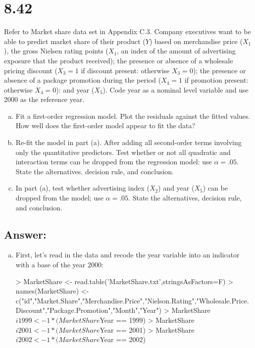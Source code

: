 \documentclass{article}
\begin{document}
\section{8.42}

Refer to Market share data set in Appendix C.3. Company executives want to be able to predict market share of their product ($Y$) based on merchandise price ($X_1$), the gross Nielsen rating points ($X_1$, an index of the amount of advertising exposure that the product received); the presence or absence of a wholesale pricing discount ($X_3 = 1$ if discount present: otherwise $X_3 = 0$); the presence or absence of a package promotion during the period ($X_4 = 1$ if promotion present: otherwise $X_4 = 0$): and year ($X_5$). Code year as a nominal level variable and use 2000 as the reference year.

\begin{enumerate}[a)]
\item{} Fit a first-order regression model. Plot the residuals against the fitted values. How well does the first-order model appear to fit the data?
\item{} Re-fit the model in part (a). After adding all second-order terms involving only the quantitative predictors. Test whether or not all quadratic and interaction terms can be dropped from the regression model: use $\alpha = .05$. State the alternatives. decision rule, and conclusion.
\item{} In part (a), test whether advertising index ($X_2$) and year ($X_5$) can be dropped from the model; use $\alpha = .05$. State the alternatives, decision rule, and conclusion.
\end{enumerate}

\subsection{Answer:}

\begin{enumerate}[a)]
\item{} First, let's read in the data and recode the year variable into an indicator with a base of the year 2000:

\begin{Schunk}
\begin{Sinput}
> MarketShare <- read.table('MarketShare.txt',stringsAsFactors=F)
> names(MarketShare) <- c("id","Market.Share","Merchandise.Price","Nielson.Rating","Wholesale.Price.Discount","Package.Promotion","Month","Year")
> MarketShare$i1999 <- 1*(MarketShare$Year == 1999)
> MarketShare$i2001 <- 1*(MarketShare$Year == 2001) 
> MarketShare$i2002 <- 1*(MarketShare$Year == 2002)
\end{Sinput}
\end{Schunk}

\end{enumerate}
\end{document}
